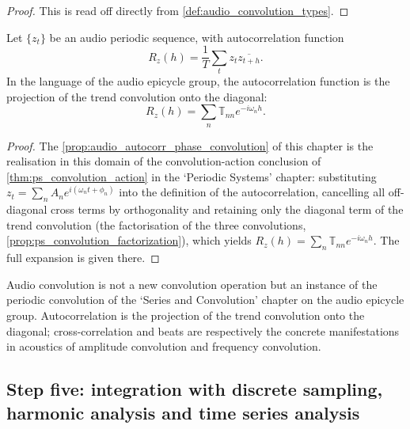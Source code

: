 \begin{proof}
This is read off directly from \cref{def:audio_convolution_types}.
\end{proof}

\begin{proposition}\label{prop:audio_autocorr_phase_convolution}
Let $\{z_t\}$ be an audio periodic sequence, with autocorrelation function
\[
R_z(h)=\frac1T\sum_t z_t\overline{z_{t+h}}.
\]
In the language of the audio epicycle group, the autocorrelation function is the projection of the trend convolution onto the diagonal:
\[
R_z(h)=\sum_n\mathbb T_{nn}e^{-i\omega_n h}.
\]
\end{proposition}

\begin{proof}
The \cref{prop:audio_autocorr_phase_convolution} of this chapter is the realisation in this domain of the convolution-action conclusion of \cref{thm:ps_convolution_action} in the `Periodic Systems' chapter:
substituting $z_t=\sum_n A_n e^{i(\omega_n t+\phi_n)}$ into the definition of the autocorrelation, cancelling all off-diagonal cross terms by orthogonality and retaining only the diagonal term of the trend convolution
(the factorisation of the three convolutions, \cref{prop:ps_convolution_factorization}), which yields $R_z(h)=\sum_n\mathbb T_{nn}e^{-i\omega_n h}$.
The full expansion is given there.
\end{proof}

\begin{remark}\label{rem:audio_convolution_relation}
Audio convolution is not a new convolution operation but an instance of the periodic convolution of the `Series and Convolution' chapter on the audio epicycle group. Autocorrelation is the projection of the trend convolution onto the diagonal; cross-correlation and beats are respectively the concrete manifestations in acoustics of amplitude convolution and frequency convolution.
\end{remark}

\subsection{Step five: integration with discrete sampling, harmonic analysis and time series analysis}

